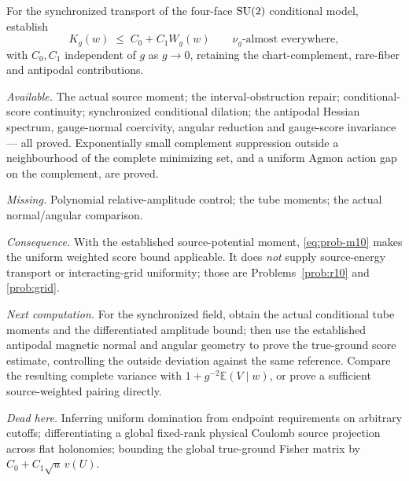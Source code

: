 \begin{problem}
\label{prob:m10}
For the synchronized transport of the four-face $\mathrm{SU}(2)$ conditional
model, establish
\begin{equation}
  K_g(w) \;\le\; C_0 + C_1 W_g(w)
  \qquad \nu_g\text{-almost everywhere},
  \label{eq:prob-m10}
\end{equation}
with $C_0, C_1$ independent of $g$ as $g \to 0$, retaining the
chart-complement, rare-fiber and antipodal contributions.

\emph{Available.} The actual source moment; the interval-obstruction
repair; conditional-score continuity; synchronized conditional dilation;
the antipodal Hessian spectrum, gauge-normal coercivity, angular
reduction and gauge-score invariance --- all proved. Exponentially small
complement suppression outside a neighbourhood of the complete minimizing
set, and a uniform Agmon action gap on the complement, are proved.

\emph{Missing.} Polynomial relative-amplitude control; the tube moments;
the actual normal/angular comparison.

\emph{Consequence.} With the established source-potential moment,
\eqref{eq:prob-m10} makes the uniform weighted score bound applicable.
It does \emph{not} supply source-energy transport or interacting-grid
uniformity; those are Problems~\ref{prob:r10} and \ref{prob:grid}.

\emph{Next computation.} For the synchronized field, obtain the actual
conditional tube moments and the differentiated amplitude bound; then use
the established antipodal magnetic normal and angular geometry to prove
the true-ground score estimate, controlling the outside deviation against
the same reference. Compare the resulting complete variance with
$1 + g^{-2}\mathbb{E}(V \mid w)$, or prove a sufficient source-weighted
pairing directly.

\emph{Dead here.} Inferring uniform domination from endpoint requirements
on arbitrary cutoffs; differentiating a global fixed-rank physical
Coulomb source projection across flat holonomies; bounding the global
true-ground Fisher matrix by $C_0 + C_1\sqrt{u}\,v(U)$.
\end{problem}

